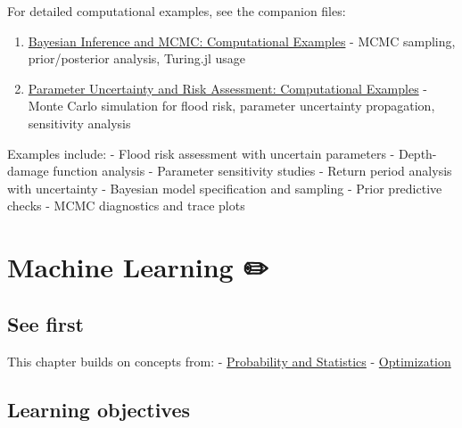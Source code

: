 \documentclass[
  letterpaper,
  DIV=11,
  numbers=noendperiod]{scrreprt}
\begin{document}
\begin{tcolorbox}[enhanced jigsaw, arc=.35mm, breakable, title=\textcolor{quarto-callout-tip-color}{\faLightbulb}\hspace{0.5em}{Computational examples}, coltitle=black, opacityback=0, bottomtitle=1mm, colback=white, left=2mm, opacitybacktitle=0.6, toptitle=1mm, colframe=quarto-callout-tip-color-frame, leftrule=.75mm, titlerule=0mm, rightrule=.15mm, bottomrule=.15mm, colbacktitle=quarto-callout-tip-color!10!white, toprule=.15mm]

For detailed computational examples, see the companion files:

\begin{enumerate}
\def\labelenumi{\arabic{enumi}.}
\item
  \href{./chapters/fundamentals/monte-carlo-bayesian.qmd}{Bayesian
  Inference and MCMC: Computational Examples} - MCMC sampling,
  prior/posterior analysis, Turing.jl usage
\item
  \href{./chapters/fundamentals/monte-carlo-uncertainty.qmd}{Parameter
  Uncertainty and Risk Assessment: Computational Examples} - Monte Carlo
  simulation for flood risk, parameter uncertainty propagation,
  sensitivity analysis
\end{enumerate}

Examples include: - Flood risk assessment with uncertain parameters -
Depth-damage function analysis - Parameter sensitivity studies - Return
period analysis with uncertainty - Bayesian model specification and
sampling - Prior predictive checks - MCMC diagnostics and trace plots

\end{tcolorbox}

\chapter{Machine Learning ✏️}\label{machine-learning}

\section*{See first}\label{see-first-2}


This chapter builds on concepts from: -
\href{./chapters/fundamentals/probability-stats.qmd}{Probability and
Statistics} -
\href{./chapters/fundamentals/optimization.qmd}{Optimization}

\section*{Learning objectives}\label{learning-objectives-4}
\end{document}
